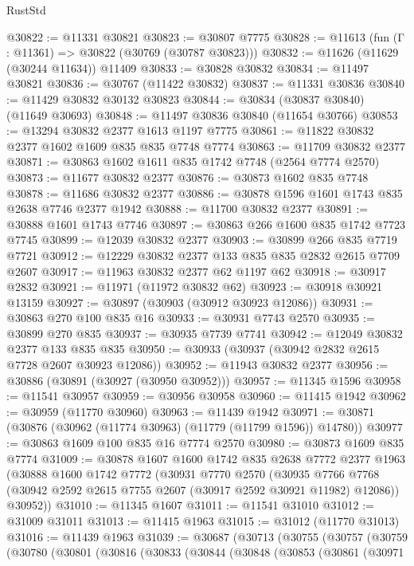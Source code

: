 \begin{lexlean}{RustStd}
\begin{coremodule}
@30822 := @11331 @30821
@30823 := @30807 @7775
@30828 := @11613 (fun (Γ : @11361) => @30822 (@30769 (@30787 @30823)))
@30832 := @11626 (@11629 (@30244 @11634)) @11409
@30833 := @30828 @30832
@30834 := @11497 @30821
@30836 := @30767 (@11422 @30832)
@30837 := @11331 @30836
@30840 := @11429 @30832 @30132 @30823
@30844 := @30834 (@30837 @30840) (@11649 @30693)
@30848 := @11497 @30836 @30840 (@11654 @30766)
@30853 := @13294 @30832 @2377 @1613 @1197 @7775
@30861 := @11822 @30832 @2377 @1602 @1609 @835 @835 @7748 @7774
@30863 := @11709 @30832 @2377
@30871 := @30863 @1602 @1611 @835 @1742 @7748 (@2564 @7774 @2570)
@30873 := @11677 @30832 @2377
@30876 := @30873 @1602 @835 @7748
@30878 := @11686 @30832 @2377
@30886 := @30878 @1596 @1601 @1743 @835 @2638 @7746 @2377 @1942
@30888 := @11700 @30832 @2377
@30891 := @30888 @1601 @1743 @7746
@30897 := @30863 @266 @1600 @835 @1742 @7723 @7745
@30899 := @12039 @30832 @2377
@30903 := @30899 @266 @835 @7719 @7721
@30912 := @12229 @30832 @2377 @133 @835 @835 @2832 @2615 @7709 @2607
@30917 := @11963 @30832 @2377 @62 @1197 @62
@30918 := @30917 @2832
@30921 := @11971 (@11972 @30832 @62)
@30923 := @30918 @30921 @13159
@30927 := @30897 (@30903 (@30912 @30923 @12086))
@30931 := @30863 @270 @100 @835 @16
@30933 := @30931 @7743 @2570
@30935 := @30899 @270 @835
@30937 := @30935 @7739 @7741
@30942 := @12049 @30832 @2377 @133 @835 @835
@30950 := @30933 (@30937 (@30942 @2832 @2615 @7728 @2607 @30923 @12086))
@30952 := @11943 @30832 @2377
@30956 := @30886 (@30891 (@30927 (@30950 @30952)))
@30957 := @11345 @1596
@30958 := @11541 @30957
@30959 := @30956 @30958
@30960 := @11415 @1942
@30962 := @30959 (@11770 @30960)
@30963 := @11439 @1942
@30971 := @30871 (@30876 (@30962 (@11774 @30963) (@11779 (@11799 @1596)) @14780))
@30977 := @30863 @1609 @100 @835 @16 @7774 @2570
@30980 := @30873 @1609 @835 @7774
@31009 := @30878
    @1607
    @1600
    @1742
    @835
    @2638
    @7772
    @2377
    @1963
    (@30888
      @1600
      @1742
      @7772
      (@30931
        @7770
        @2570
        (@30935 @7766 @7768 (@30942 @2592 @2615 @7755 @2607 (@30917 @2592 @30921 @11982) @12086))
        @30952))
@31010 := @11345 @1607
@31011 := @11541 @31010
@31012 := @31009 @31011
@31013 := @11415 @1963
@31015 := @31012 (@11770 @31013)
@31016 := @11439 @1963
@31039 := @30687
    (@30713
      (@30755
        (@30757
          (@30759
            (@30780
              (@30801
                (@30816
                  (@30833
                    (@30844
                      (@30848
                        (@30853
                          (@30861
                            (@30971

\end{coremodule}
\end{lexlean}
